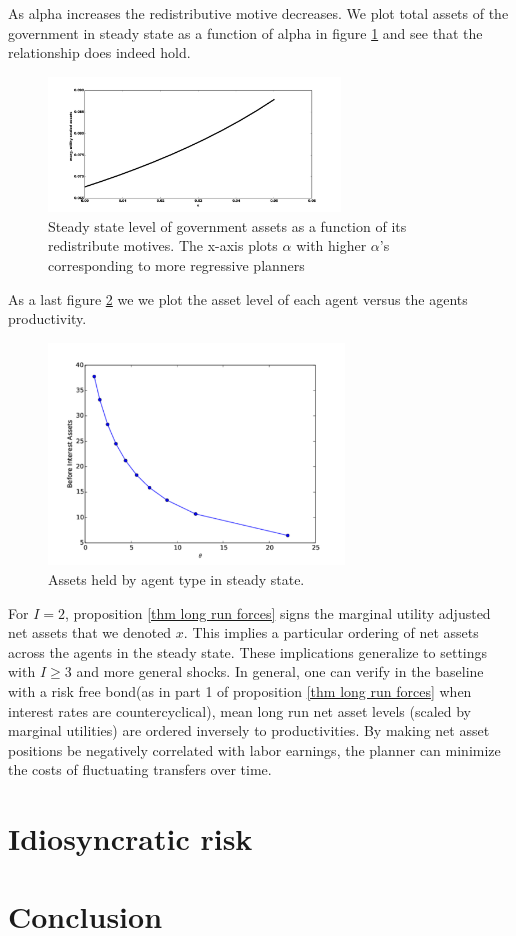 \documentclass[11.5pt,twoside]{article}
\begin{document}
As alpha increases the redistributive motive decreases.  We plot total assets of the government in steady state as a function of alpha in figure \ref{fig: comp_statics} and see that the relationship does indeed hold.
 \begin{figure}[htp]
 \label{fig: comp_statics}
 	\centering
 	\includegraphics[width=0.69\textwidth]{plots/comp_statics.pdf}
 	\caption{Steady state level of government assets as a function of its redistribute motives. The x-axis plots $\alpha$ with higher $\alpha$'s corresponding to more regressive planners}
 \end{figure}
 

As a last figure \ref{fig: asset distribution} we we plot the asset level of each agent versus the agents productivity.  
 \begin{figure}[htp]
 \label{fig: asset distribution}
 \centering
 \includegraphics[width=0.7\textwidth]{plots/spanning.pdf}
 \caption{Assets held by agent type in steady state.}
 \end{figure}
 
For $I=2$, proposition \ref{thm long run forces}  signs the marginal utility adjusted net assets that we denoted  $x$. This implies a particular ordering of net assets across the agents in the steady state. These implications generalize to settings with $I\geq3$ and more general shocks. In general, one can verify in the baseline with a risk free bond(as in  part 1 of proposition \ref{thm long run forces} when interest rates are countercyclical), mean long run net asset  levels (scaled by marginal utilities) are ordered inversely to productivities. By making  net asset positions be negatively correlated with labor earnings, the planner can minimize the costs of fluctuating transfers over time.

\section{Idiosyncratic risk}

\section{Conclusion}


\newpage
\end{document}
